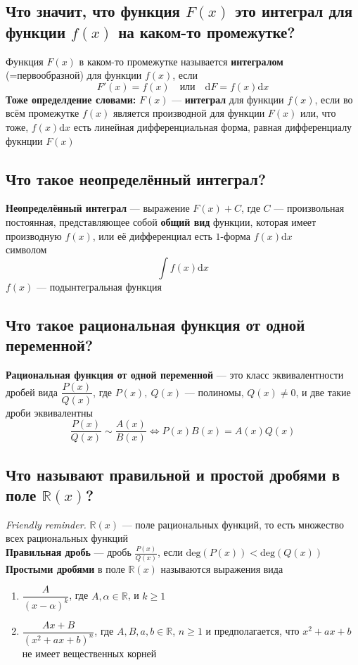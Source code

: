 \documentclass[a4paper]{article}
\begin{document}
\subsection{Что значит, что функция $F(x)$ это интеграл для функции $f(x)$ на каком-то промежутке?}
Функция $F(x)$ в каком-то промежутке называется \textbf{интегралом} (=первообразной) для функции $f(x)$, если 
$$F'(x) = f(x) \quad \mbox{или} \quad  \mathrm{d}F = f(x) \mathrm{d}x$$
\indent\textbf{Тоже определдение словами:} $F(x)$ — \textbf{интеграл} для функции $f(x)$, если во всём промежутке $f(x)$ является производной для функции $F(x)$ или, что тоже, $f(x)\mathrm{d}x$ есть линейная дифференциальная форма, равная дифференциалу фукнции $F(x)$

\subsection{Что такое неопределённый интеграл?}
\label{1.8}
\textbf{Неопределённый интеграл} — выражение $F(x) + C$, где $C$ — произвольная постоянная, представляющее собой \textbf{общий вид} функции, которая имеет производную $f(x)$, или её дифференциал есть $1$-форма $f(x) \mathrm{d}x$\\[2mm]
 символом
$$
\int f(x) \mathrm{d}x
$$
\indent$f(x)$ — подынтегральная функция

\subsection{Что такое рациональная функция от одной переменной?}
\textbf{Рациональная функция от одной переменной} — это класс эквивалентности дробей вида $\dfrac{P(x)}{Q(x)}$, где $P(x),\ Q(x)$ — полиномы, $Q(x) \ne 0$, и две такие дроби эквивалентны
$$
\frac{P(x)}{Q(x)} \sim \frac{A(x)}{B(x)}\Longleftrightarrow P(x) B(x) = A(x) Q(x)
$$
\subsection{Что называют правильной и простой дробями в поле $\mathbb{R}(x)$?}
\textit{Friendly reminder.} $\mathbb{R}(x)$ — поле рациональных функций, то есть множество всех рациональных функций\\[2mm]
\indent \textbf{Правильная дробь} — дробь $\displaystyle\frac{P(x)}{Q(x)}$, если $\mathrm{deg}(P(x)) < \mathrm{deg}(Q(x))$\\[2mm]
\indent \textbf{Простыми дробями} в поле $\mathbb{R}(x)$ называются выражения вида
\begin{enumerate}
    \item $\dfrac{A}{(x-\alpha)^k}$, где $A,\alpha \in \mathbb{R}$, и $k\geqslant 1$
    \item $\dfrac{Ax + B}{(x^2 + ax + b)^n}$, где $A,B, a,b \in \mathbb{R}$, $n\geqslant 1$ и предполагается, что $x^2 + ax +b$ не имеет вещественных корней
\end{enumerate}
\end{document}
